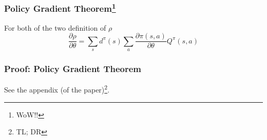 \begin{frame}
  \frametitle{Policy Gradient Theorem\footnote{WoW!!}}
  For both of the two definition of $\rho$
  \begin{equation*}
    \frac{\partial \rho}{\partial \theta} = \sum_s d^\pi (s) \sum_a \frac{\partial \pi(s, a)}{\partial \theta} Q^\pi(s, a)
  \end{equation*}  
\end{frame}

\begin{frame}
  \frametitle{Proof: Policy Gradient Theorem}
  See the appendix (of the paper)\footnote{TL; DR}.
\end{frame}